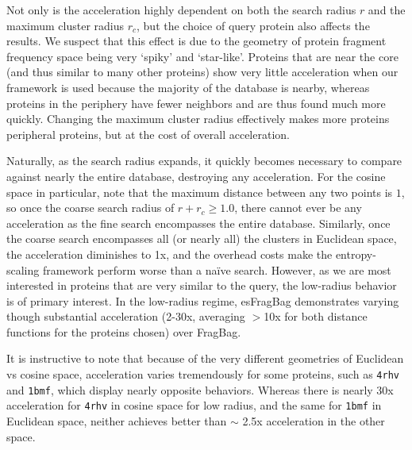 \documentclass[review,preprint,12pt]{elsarticle}
\theoremstyle{definition}
\theoremstyle{remark}
\numberwithin{equation}{section}
\begin{document}
Not only is the acceleration highly dependent on both the search radius $r$ and the maximum cluster radius $r_c$,
but the choice of query protein also affects the results.
We suspect that this effect is due to the geometry of protein fragment frequency space being very `spiky' and `star-like'.
Proteins that are near the core (and thus similar to many other proteins) show very little acceleration when our framework is used because the majority of the database is nearby, whereas proteins in the periphery have fewer neighbors and are thus found much more quickly.
Changing the maximum cluster radius effectively makes more proteins peripheral proteins, but at the cost of overall acceleration.

Naturally, as the search radius expands, it quickly becomes necessary to compare against nearly the entire database, destroying any acceleration.
For the cosine space in particular, note that the maximum distance between any two points is $1$, so once the coarse search radius of $r+r_c \ge 1.0$, there cannot ever be any acceleration as the fine search encompasses the entire database.
Similarly, once the coarse search encompasses all (or nearly all) the clusters in Euclidean space, the acceleration diminishes to 1x, and the overhead costs make the entropy-scaling framework perform worse than a na\"ive search.
However, as we are most interested in proteins that are very similar to the query, the low-radius behavior is of primary interest.
In the low-radius regime, esFragBag demonstrates varying though substantial acceleration (2-30x, averaging $>$10x for both distance functions for the proteins chosen) over FragBag.

It is instructive to note that because of the very different geometries of Euclidean vs cosine space, acceleration varies tremendously for some proteins, such as \texttt{4rhv} and \texttt{1bmf}, which display nearly opposite behaviors.
Whereas there is nearly 30x acceleration for \texttt{4rhv} in cosine space for low radius, and the same for \texttt{1bmf} in Euclidean space, neither achieves better than $\sim$ 2.5x acceleration in the other space.
\end{document}
